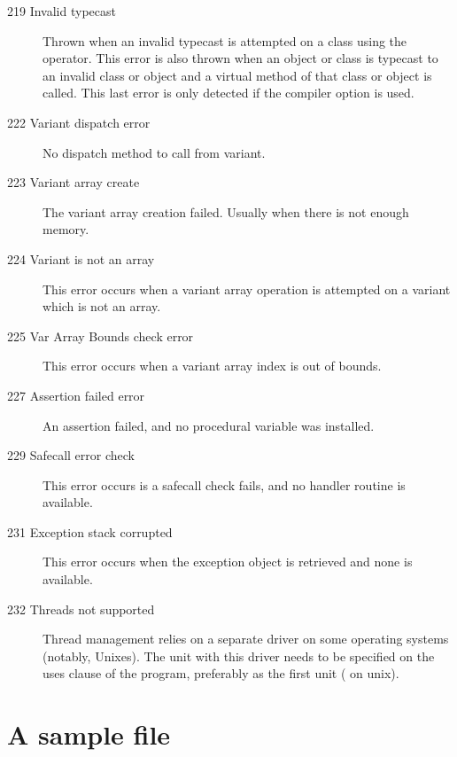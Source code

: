 \begin{description}
\item [219 Invalid typecast]

Thrown when an invalid typecast is attempted on a class using the 
operator. This error is also thrown when an object or class is
typecast to an invalid class or object and a virtual method of
that class or object is called. This last error is only detected
if the  compiler option is used.


\item[222 Variant dispatch error]
No dispatch method to call from variant.

\item[223 Variant array create]
The variant array creation failed. Usually when there is not enough memory.

\item[224 Variant is not an array]
This error occurs when a variant array operation is attempted on a variant
which is not an array.

\item[225 Var Array Bounds check error]
This error occurs when a variant array index is out of bounds.

\item [227 Assertion failed error]
An assertion failed, and no  procedural variable was 
installed.

\item [229 Safecall error check]
This error occurs is a safecall check fails, and no handler routine is
available.

\item [231 Exception stack corrupted]
This error occurs when the exception object is retrieved and none is
available.

\item [232 Threads not supported]
Thread management relies on a separate driver on some operating systems
(notably, Unixes). The unit with this driver needs to be specified on
the uses clause of the program, preferably as the first unit
( on unix).

\end{description}



\chapter{A sample  file}
\label{ch:GdbIniFile}

